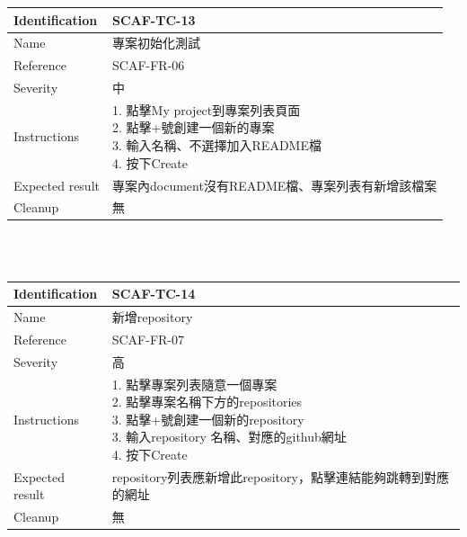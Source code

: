 \documentclass{report}
\begin{document}
\begin{tabularx}{\textwidth}{
  |p{}%
  |p{}|%
  }
  \hline
  \centering Identification &  SCAF-TC-13 \\
  \hline
  \centering Name & 專案初始化測試 \\
  \hline
  \centering Reference & SCAF-FR-06 \\
  \hline
  \centering Severity & 中 \\
  \hline
  \centering Instructions & 
  \makecell[l]{
    1. 點擊My project到專案列表頁面  \\
    2. 點擊+號創建一個新的專案  \\
    3. 輸入名稱、不選擇加入README檔  \\
    4. 按下Create
  }\\
  \hline
  \centering Expected result & 專案內document沒有README檔、專案列表有新增該檔案 \\
  \hline
  \centering Cleanup & 無 \\
  \hline
\end{tabularx}
\\
\newline
\\
\begin{tabularx}{\textwidth}{
  |p{}%
  |p{}|%
  }
  \hline
  \centering Identification &  SCAF-TC-14 \\
  \hline
  \centering Name & 新增repository \\
  \hline
  \centering Reference & SCAF-FR-07 \\
  \hline
  \centering Severity & 高 \\
  \hline
  \centering Instructions & 
  \makecell[l]{
    1. 點擊專案列表隨意一個專案 \\
    2. 點擊專案名稱下方的repositories \\
    3. 點擊+號創建一個新的repository \\
    3. 輸入repository 名稱、對應的github網址  \\
    4. 按下Create
  }\\
  \hline
  \centering Expected result & repository列表應新增此repository，點擊連結能夠跳轉到對應的網址 \\
  \hline
  \centering Cleanup & 無 \\
  \hline
\end{tabularx}
\\
\end{document}
